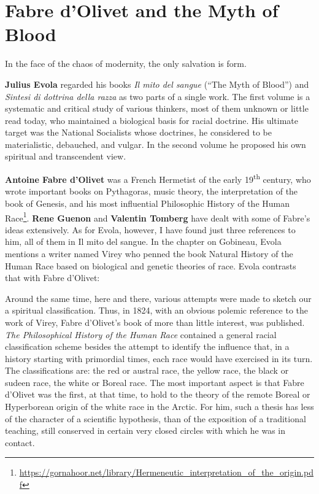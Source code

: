 \section{Fabre d’Olivet and the Myth of Blood}

\begin{quotex}
In the face of the chaos of modernity, the only salvation is form.
\end{quotex}


\textbf{Julius Evola} regarded his books \textit{Il mito del sangue} (``The Myth of Blood'') and \textit{Sintesi di dottrina della razza} as two parts of a single work. The first volume is a systematic and critical study of various thinkers, most of them unknown or little read today, who maintained a biological basis for racial doctrine. His ultimate target was the National Socialists whose doctrines, he considered to be materialistic, debauched, and vulgar. In the second volume he proposed his own spiritual and transcendent view.

\textbf{Antoine Fabre d'Olivet} was a French Hermetist of the early 19\textsuperscript{th} century, who wrote important books on Pythagoras, music theory, the interpretation of the book of Genesis, and his most influential Philosophic History of the Human Race\footnote{\url{https://gornahoor.net/library/Hermeneutic\_interpretation\_of\_the\_origin.pdf}}. \textbf{Rene Guenon} and \textbf{Valentin Tomberg} have dealt with some of Fabre's ideas extensively. As for Evola, however, I have found just three references to him, all of them in Il mito del sangue. In the chapter on Gobineau, Evola mentions a writer named Virey who penned the book Natural History of the Human Race based on biological and genetic theories of race. Evola contrasts that with Fabre d'Olivet:

\begin{quotex}
Around the same time, here and there, various attempts were made to sketch our a spiritual classification. Thus, in 1824, with an obvious polemic reference to the work of Virey, Fabre d'Olivet's book of more than little interest, was published. \emph{The Philosophical History of the Human Race} contained a general racial classification scheme besides the attempt to identify the influence that, in a history starting with primordial times, each race would have exercised in its turn. The classifications are: the red or austral race, the yellow race, the black or sudeen race, the white or Boreal race. The most important aspect is that Fabre d'Olivet was the first, at that time, to hold to the theory of the remote Boreal or Hyperborean origin of the white race in the Arctic. For him, such a thesis has less of the character of a scientific hypothesis, than of the exposition of a traditional teaching, still conserved in certain very closed circles with which he was in contact.
\end{quotex}


